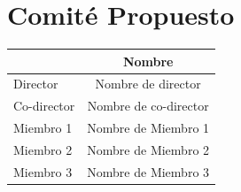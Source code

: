 \documentclass[10pt,letterpaper]{report}
\begin{document}
\chapter*{Comité Propuesto}
\begin{table}[htbp]
    \centering
    \begin{tabular}{lc}
        \toprule
        & Nombre \\
        \midrule
        Director &  Nombre de director\\
        Co-director &  Nombre de co-director\\
        Miembro 1 &  Nombre de Miembro 1\\
        Miembro 2 &  Nombre de Miembro 2\\
        Miembro 3 &  Nombre de Miembro 3\\
        \bottomrule
    \end{tabular}%
\end{table}%

\printbibliography[title={Referencias}]
\end{document}
